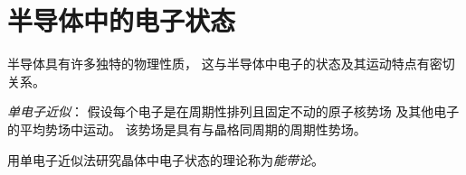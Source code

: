 \chapter{半导体中的电子状态}

半导体具有许多独特的物理性质，
这与半导体中电子的状态及其运动特点有密切关系。

\emph{单电子近似}：
假设每个电子是在周期性排列且固定不动的原子核势场
及其他电子的平均势场中运动。
该势场是具有与晶格同周期的周期性势场。

用单电子近似法研究晶体中电子状态的理论称为\emph{能带论}。



